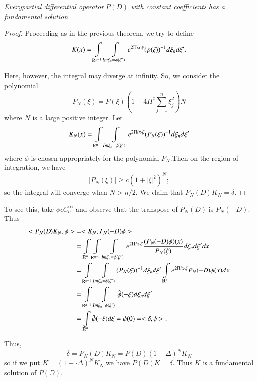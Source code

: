 \setcounter{thm}{5}
\begin{thm} \label{chap2:sec1:thm2.6}%
\em{Every\pageoriginale partial differential operator $P(D)$ with constant
  coefficients has a fundamental solution}. 
\end{thm}
\begin{proof}
 Proceeding as in the previous theorem, we try to define
 $$
 K(x) = \int\limits_{\varmathbb{R}^{n-1}} \int\limits_{Im \xi _{n}=
   \phi (\xi ')} e ^{2 \Pi i x \cdot \xi} (p(\xi))^{-1} d\xi_n d
 \xi'. 
 $$
 
 Here, however, the integral may diverge at infinity. So, we consider
 the polynomial 
  $$
 P_N ( \xi ) = P (\xi) (1 + 4 \Pi ^2 \sum_{j=1}^{n} \xi _j^2 ) N
 $$
 where $N$ is a large positive integer. Let 
$$
K_N (x) = \int\limits_{\varmathbb{R}^{n-1}} \int\limits_{ Im \xi _n =
  \phi ( \xi ')} e^{2 \Pi i x \cdot \xi } (P_N (\xi ))^{-1} d \xi _n d
\xi '	 
$$
where $\phi$ is chosen appropriately for the polynomial $P_N$.Then on
the region of integration, we have 
$$
|P_N (\xi)|\geq c (1+ |\xi|^2)^N;
$$
so the integral will converge when $N > n/2$. We claim that $P_N (D)
K_N = \delta$. 
\end{proof}
	
To see this, take $\phi \epsilon C_o^ \infty$ and observe that the
transpose of $P_N (D)$ is $P_N(-D)$. Thus 
{\fontsize{10pt}{12pt}\selectfont
\begin{align*}
  <P_N (D) K_N, \phi > & =  < K_N, P_N (-D) \phi>\\
  &= \int\limits_{\varmathbb{R}^{n}}\int\limits_{\varmathbb{R}^{n-1}}
  \int\limits_{Im \xi _n = \phi (\xi')} e^{2 \Pi ix\cdot \xi
  }\frac{(P_N(-D) \phi)(x)}{P_N(\xi)}d\xi_n d\xi ' dx\\ 
  &=\int\limits_{\varmathbb{R}^{n-1}} \int\limits_{Im \xi _n = \phi (\xi
    ')} (P_N (\xi))^{-1} d\xi_n d \xi
  '\int\limits_{\varmathbb{R}^{n}}e ^{2 \Pi ix \cdot \xi}P_N(-D) \phi
  (x) dx\\ 
  &= \int\limits_{\varmathbb{R}^{n-1}} \int\limits_{Im \xi _n = \phi
    (\xi ')} \hat{\phi} (-\xi) d \xi_n d \xi'\\ 
  &= \int\limits_{\varmathbb{R}^{n}} \hat{\phi} (- \xi) d \xi = \phi
  (0) = < \delta, \phi >. 
\end{align*}}\relax\pageoriginale

Thus,
$$
\delta = P_N (D) K_N = P(D)(1 - \Delta)^N K_N	
$$
so if we put $ K= (1 - \cdot \Delta)^N K_N $ we have $P(D) K=
\delta$. Thus $K$ is a fundamental solution of $P(D)$. 

